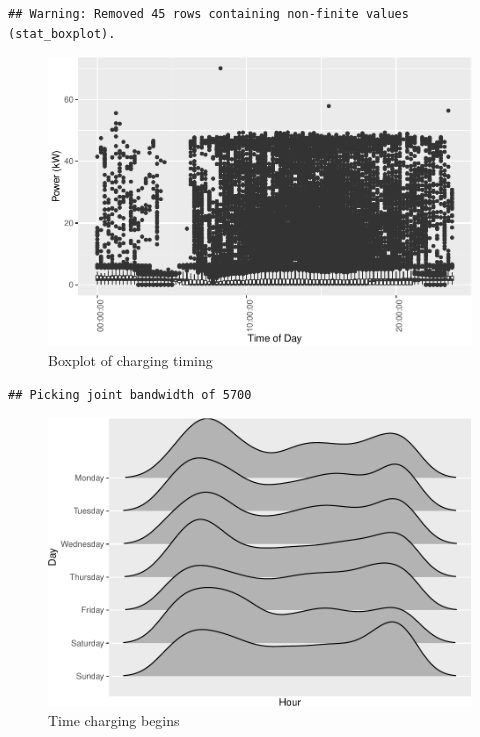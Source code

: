 \documentclass[]{article}
\begin{document}
\begin{verbatim}
## Warning: Removed 45 rows containing non-finite values (stat_boxplot).
\end{verbatim}

\begin{figure}
\centering
\includegraphics{EVBB_report_files/figure-latex/plot2-1.pdf}
\caption{\label{fig:plot2}Boxplot of charging timing}
\end{figure}

\begin{verbatim}
## Picking joint bandwidth of 5700
\end{verbatim}

\begin{figure}
\centering
\includegraphics{EVBB_report_files/figure-latex/ggjoyplotTimeChargingBegins-1.pdf}
\caption{\label{fig:ggjoyplotTimeChargingBegins}Time charging begins}
\end{figure}
\end{document}
